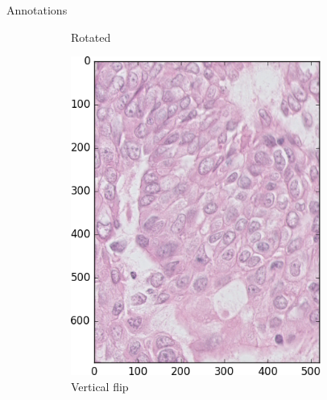 \documentclass{beamer}
\begin{document}
\begin{frame}{Annotations}
\begin{figure}
\begin{multicols}{6}
\begin{subfigure}{0.2\textwidth}
     \caption{Rotated}
     \label{fig:rot}
	\end{subfigure}%
    \begin{subfigure}{0.2\textwidth}
    \includegraphics[width=0.9\textwidth]{flip.png}\par 
     \caption{Vertical flip}
     \label{fig:flip}
	\end{subfigure}%
	\begin{subfigure}{0.2\textwidth}

\end{subfigure}
\end{multicols}
\end{figure}
\end{frame}
\end{document}
